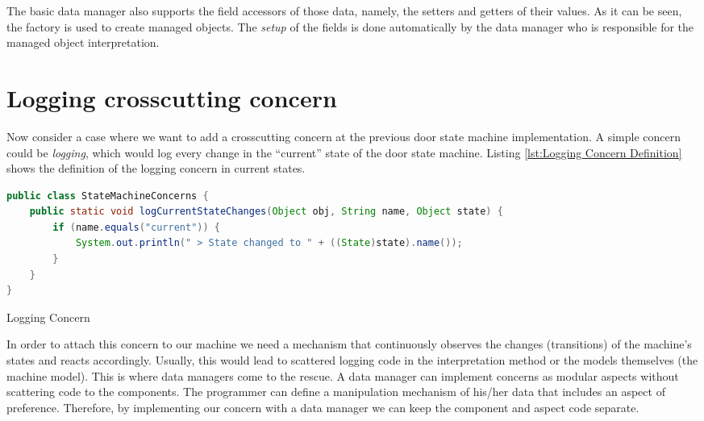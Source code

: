 The basic data manager also supports the field accessors of those data, namely, the setters and getters of their values.
As it can be seen, the factory is used to create managed objects.
The \textit{setup} of the fields is done automatically by the data manager who is responsible for the managed object interpretation.

\section{Logging crosscutting concern}
Now consider a case where we want to add a crosscutting concern at the previous door state machine implementation.
A simple concern could be \textit{logging}, which would log every change in the ``current'' state of the door state machine.
Listing \ref{lst:Logging Concern Definition} shows the definition of the logging concern in current states.

\begin{sourcecode} [H]
	\begin{lstlisting}[language=Java, escapechar=|]
public class StateMachineConcerns {
	public static void logCurrentStateChanges(Object obj, String name, Object state) {
		if (name.equals("current")) {
			System.out.println(" > State changed to " + ((State)state).name());
		}
	}
}
	\end{lstlisting}
	\caption{Logging Concern}
	\label{lst:Logging Concern Definition}
\end{sourcecode}

In order to attach this concern to our machine we need a mechanism that continuously observes the changes (transitions) of the machine's states and reacts accordingly.
Usually, this would lead to scattered logging code in the interpretation method or the models themselves (the machine model).
This is where data managers come to the rescue.
A data manager can implement concerns as modular aspects without scattering code to the components.
The programmer can define a manipulation mechanism of his/her data that includes an aspect of preference.
Therefore, by implementing our concern with a data manager we can keep the component and aspect code separate.


